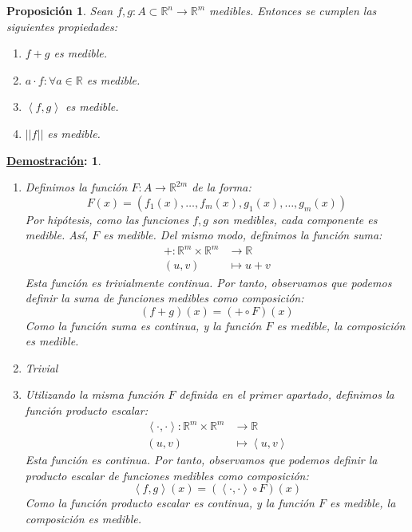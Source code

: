 \documentclass[10pt,a4paper,openright]{book}
\theoremstyle{break}
\newtheorem*{prop}{Proposición}
\newtheorem*{demo}{\underline{Demostración}:}
\begin{document}
\begin{prop}
Sean $f, g: A\subset \mathbb{R}^n \rightarrow \mathbb{R}^m$ medibles. Entonces se cumplen las siguientes propiedades:
\begin{enumerate}
\item $f+g$ es medible.
\item $a\cdot f : \forall a \in \mathbb{R} $ es medible.
\item $\left<f, g\right>$ es medible.
\item $\vert \vert f \vert \vert$ es medible.
\end{enumerate}
\end{prop}
\begin{demo}
\begin{enumerate}
\item Definimos la función $F: A \to \mathbb{R}^{2m}$ de la forma:
$$F\left( x \right) = \left( f_1\left( x \right), \ldots, f_m\left( x \right), g_1\left( x \right), \ldots, g_m\left( x \right) \right)$$
Por hipótesis, como las funciones $f,g$ son medibles, cada componente es medible. Así, $F$ es medible. Del mismo modo, definimos la función suma: 
\begin{align*}
+: \mathbb{R}^m \times \mathbb{R}^m & \rightarrow \mathbb{R} \\
\left( u, v \right) &\mapsto u+v
\end{align*}
Esta función es trivialmente continua. Por tanto, observamos que podemos definir la suma de funciones medibles como composición:
$$\left( f + g \right)\left( x \right) = \left( + \circ F \right)\left( x \right)$$
Como la función suma es continua, y la función $F$ es medible, la composición es medible.

\item Trivial

\item Utilizando la misma función $F$ definida en el primer apartado, definimos la función producto escalar:
\begin{align*}
\left< \cdot , \cdot \right>: \mathbb{R}^m \times \mathbb{R}^m & \rightarrow \mathbb{R} \\
\left( u, v \right) &\mapsto \left<u, v\right>
\end{align*}
Esta función es continua. Por tanto, observamos que podemos definir la producto escalar de funciones medibles como composición:
$$\left<f, g\right> \left( x \right) = \left( \left< \cdot, \cdot\right> \circ F \right)\left( x \right)$$
Como la función producto escalar es continua, y la función $F$ es medible, la composición es medible.


\end{enumerate}
\end{demo}
\end{document}
